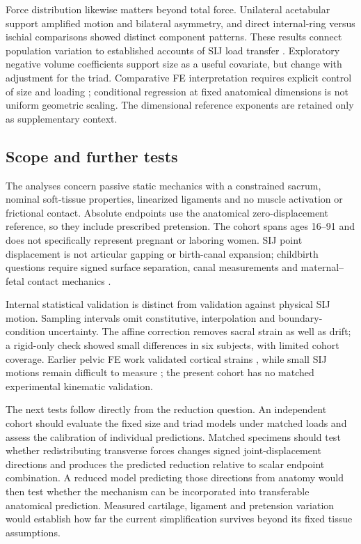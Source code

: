 Force distribution likewise matters beyond total force. Unilateral acetabular support amplified motion and bilateral asymmetry, and direct internal-ring versus ischial comparisons showed distinct component patterns. These results connect population variation to established accounts of SIJ load transfer \citep{Snijders1993,Vleeming2012}. Exploratory negative volume coefficients support size as a useful covariate, but change with adjustment for the triad. Comparative FE interpretation requires explicit control of size and loading \citep{Dumont2009}; conditional regression at fixed anatomical dimensions is not uniform geometric scaling. The dimensional reference exponents are retained only as supplementary context.

\subsection*{Scope and further tests}
The analyses concern passive static mechanics with a constrained sacrum, nominal soft-tissue properties, linearized ligaments and no muscle activation or frictional contact. Absolute endpoints use the anatomical zero-displacement reference, so they include prescribed pretension. The cohort spans ages 16--91 and does not specifically represent pregnant or laboring women. SIJ point displacement is not articular gapping or birth-canal expansion; childbirth questions require signed surface separation, canal measurements and maternal--fetal contact mechanics \citep{ChenGrimm2021}.

Internal statistical validation is distinct from validation against physical SIJ motion. Sampling intervals omit constitutive, interpolation and boundary-condition uncertainty. The affine correction removes sacral strain as well as drift; a rigid-only check showed small differences in six subjects, with limited cohort coverage. Earlier pelvic FE work validated cortical strains \citep{Anderson2005}, while small SIJ motions remain difficult to measure \citep{Goode2008}; the present cohort has no matched experimental kinematic validation.

The next tests follow directly from the reduction question. An independent cohort should evaluate the fixed size and triad models under matched loads and assess the calibration of individual predictions. Matched specimens should test whether redistributing transverse forces changes signed joint-displacement directions and produces the predicted reduction relative to scalar endpoint combination. A reduced model predicting those directions from anatomy would then test whether the mechanism can be incorporated into transferable anatomical prediction. Measured cartilage, ligament and pretension variation would establish how far the current simplification survives beyond its fixed tissue assumptions.
